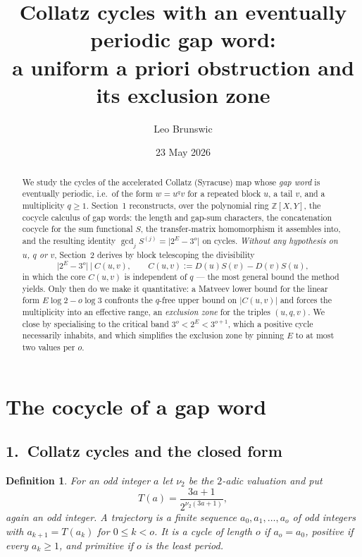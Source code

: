 \documentclass[11pt,a4paper]{article}
\title{Collatz cycles with an eventually periodic gap word:\\
       a uniform a priori obstruction and its exclusion zone}
\author{Leo Brunswic}
\date{23 May 2026}
\theoremstyle{bourbaki}
\theoremstyle{bourbakidef}
\newtheorem{defn}[thm]{Definition}
\newcommand{\Z}{\mathbb{Z}}
\begin{document}
\maketitle

\begin{abstract}
We study the cycles of the accelerated Collatz (Syracuse) map whose \emph{gap word}
is eventually periodic, i.e.\ of the form $w=u^{q}v$ for a repeated block $u$, a tail
$v$, and a multiplicity $q\ge 1$. Section~1 reconstructs, over the polynomial ring
$\Z[X,Y]$, the cocycle calculus of gap words: the length and gap-sum characters, the
concatenation cocycle for the sum functional $S$, the transfer-matrix homomorphism it
assembles into, and the resulting identity $\gcd_{j}S^{(j)}=\lvert 2^{E}-3^{o}\rvert$ on
cycles. \emph{Without any hypothesis on $u$, $q$ or $v$}, Section~2 derives by block
telescoping the divisibility
\[
   \lvert 2^{E}-3^{o}\rvert \ \big|\ C(u,v),\qquad C(u,v):=D(u)S(v)-D(v)S(u),
\]
in which the core $C(u,v)$ is independent of $q$ --- the most general bound the method
yields. Only then do we make it quantitative: a Matveev lower bound for the linear form
$E\log 2-o\log 3$ confronts the $q$-free upper bound on $\lvert C(u,v)\rvert$ and forces
the multiplicity into an effective range, an \emph{exclusion zone} for the triples
$(u,q,v)$. We close by specialising to the critical band $3^{o}<2^{E}<3^{o+1}$, which a
positive cycle necessarily inhabits, and which simplifies the exclusion zone by pinning
$E$ to at most two values per $o$.
\end{abstract}

\tableofcontents

\bigskip

\section{The cocycle of a gap word}

\subsection*{1.\ Collatz cycles and the closed form}

\begin{defn}\label{def:T}
For an odd integer $a$ let $\nu_{2}$ be the $2$-adic valuation and put
\[
   T(a)=\frac{3a+1}{2^{\nu_{2}(3a+1)}},
\]
again an odd integer. A \emph{trajectory} is a finite sequence $a_{0},a_{1},\dots,a_{o}$
of odd integers with $a_{k+1}=T(a_{k})$ for $0\le k<o$. It is a \emph{cycle} of length
$o$ if $a_{o}=a_{0}$, \emph{positive} if every $a_{k}\ge 1$, and \emph{primitive} if
$o$ is the least period.
\end{defn}
\end{document}
